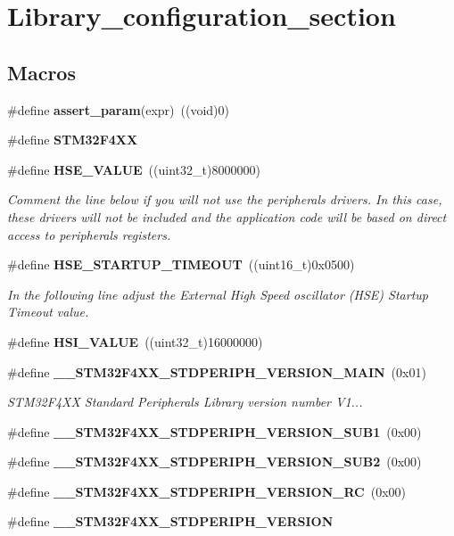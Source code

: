 \section{Library\+\_\+configuration\+\_\+section}
\label{group__Library__configuration__section}
\subsection*{Macros}
\begin{DoxyCompactItemize}
\item 
\#define \textbf{ assert\+\_\+param}(expr)~((void)0)
\item 
\#define \textbf{ S\+T\+M32\+F4\+XX}
\item 
\#define \textbf{ H\+S\+E\+\_\+\+V\+A\+L\+UE}~((uint32\+\_\+t)8000000)
\begin{DoxyCompactList}\small\item\em Comment the line below if you will not use the peripherals drivers. In this case, these drivers will not be included and the application code will be based on direct access to peripherals registers. \end{DoxyCompactList}\item 
\#define \textbf{ H\+S\+E\+\_\+\+S\+T\+A\+R\+T\+U\+P\+\_\+\+T\+I\+M\+E\+O\+UT}~((uint16\+\_\+t)0x0500)
\begin{DoxyCompactList}\small\item\em In the following line adjust the External High Speed oscillator (H\+SE) Startup Timeout value. \end{DoxyCompactList}\item 
\#define \textbf{ H\+S\+I\+\_\+\+V\+A\+L\+UE}~((uint32\+\_\+t)16000000)
\item 
\#define \textbf{ \+\_\+\+\_\+\+S\+T\+M32\+F4\+X\+X\+\_\+\+S\+T\+D\+P\+E\+R\+I\+P\+H\+\_\+\+V\+E\+R\+S\+I\+O\+N\+\_\+\+M\+A\+IN}~(0x01)
\begin{DoxyCompactList}\small\item\em S\+T\+M32\+F4\+XX Standard Peripherals Library version number V1... \end{DoxyCompactList}\item 
\#define \textbf{ \+\_\+\+\_\+\+S\+T\+M32\+F4\+X\+X\+\_\+\+S\+T\+D\+P\+E\+R\+I\+P\+H\+\_\+\+V\+E\+R\+S\+I\+O\+N\+\_\+\+S\+U\+B1}~(0x00)
\item 
\#define \textbf{ \+\_\+\+\_\+\+S\+T\+M32\+F4\+X\+X\+\_\+\+S\+T\+D\+P\+E\+R\+I\+P\+H\+\_\+\+V\+E\+R\+S\+I\+O\+N\+\_\+\+S\+U\+B2}~(0x00)
\item 
\#define \textbf{ \+\_\+\+\_\+\+S\+T\+M32\+F4\+X\+X\+\_\+\+S\+T\+D\+P\+E\+R\+I\+P\+H\+\_\+\+V\+E\+R\+S\+I\+O\+N\+\_\+\+RC}~(0x00)
\item 
\#define \textbf{ \+\_\+\+\_\+\+S\+T\+M32\+F4\+X\+X\+\_\+\+S\+T\+D\+P\+E\+R\+I\+P\+H\+\_\+\+V\+E\+R\+S\+I\+ON}
\end{DoxyCompactItemize}


